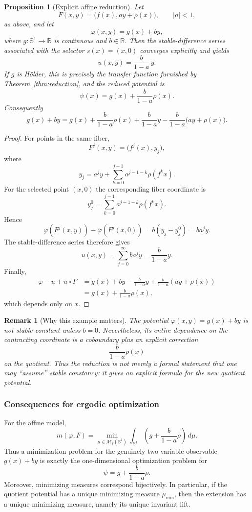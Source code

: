 \documentclass[11pt,a4paper]{article}
\newtheorem{proposition}[theorem]{Proposition}
\newtheorem{remark}[theorem]{Remark}
\newcommand{\M}{\mathcal M}
\begin{document}
\begin{proposition}[Explicit affine reduction]
\label{prop:affine-explicit}
Let
\[
F(x,y)=\bigl(f(x),ay+\rho(x)\bigr),\qquad |a|<1,
\]
as above, and let
\[
\varphi(x,y)=g(x)+by,
\]
where $g:\mathbb S^1\to\mathbb R$ is continuous and $b\in\mathbb R$.
Then the stable-difference series associated with the selector $s(x)=(x,0)$
converges explicitly and yields
\[
\boxed{u(x,y)=\frac{b}{1-a}\,y}.
\]
If $g$ is H\"older, this is precisely the transfer function furnished by
Theorem~\ref{thm:reduction}, and the reduced potential is
\[
\boxed{\psi(x)=g(x)+\frac{b}{1-a}\rho(x).}
\]
Consequently
\[
\boxed{
g(x)+by
=
g(x)+\frac{b}{1-a}\rho(x)
+\frac{b}{1-a}y
-\frac{b}{1-a}\bigl(ay+\rho(x)\bigr).
}
\]
\end{proposition}

\begin{proof}
For points in the same fiber,
\[
F^j(x,y)=\bigl(f^j(x),y_j\bigr),
\]
where
\[
y_j=a^jy+
\sum_{k=0}^{j-1}a^{j-1-k}\rho(f^kx).
\]
For the selected point $(x,0)$ the corresponding fiber coordinate is
\[
y_j^0=
\sum_{k=0}^{j-1}a^{j-1-k}\rho(f^kx).
\]
Hence
\[
\varphi(F^j(x,y))-\varphi(F^j(x,0))
=b(y_j-y_j^0)=ba^jy.
\]
The stable-difference series therefore gives
\[
u(x,y)=\sum_{j=0}^\infty ba^jy
=\frac{b}{1-a}y.
\]
Finally,
\[
\begin{aligned}
\varphi-u+u\circ F
&=g(x)+by-\frac{b}{1-a}y
+\frac{b}{1-a}(ay+\rho(x))\\
&=g(x)+\frac{b}{1-a}\rho(x),
\end{aligned}
\]
which depends only on $x$.
\end{proof}

\begin{remark}[Why this example matters]
The potential $\varphi(x,y)=g(x)+by$ is not stable-constant unless $b=0$.
Nevertheless, its entire dependence on the contracting coordinate is a
coboundary plus an explicit correction
\[
\frac{b}{1-a}\rho(x)
\]
on the quotient. Thus the reduction is not merely a formal statement that
one may ``assume'' stable constancy: it gives an explicit formula for the
new quotient potential.
\end{remark}

\subsubsection{Consequences for ergodic optimization}

For the affine model,
\[
m(\varphi,F)
=
\min_{\mu\in\M_f(\mathbb S^1)}
\int_{\mathbb S^1}
\left(g+\frac{b}{1-a}\rho\right)\,d\mu.
\]
Thus a minimization problem for the genuinely two-variable observable
$g(x)+by$ is exactly the one-dimensional optimization problem for
\[
\psi=g+\frac{b}{1-a}\rho.
\]
Moreover, minimizing measures correspond bijectively. In particular, if the
quotient potential has a unique minimizing measure $\mu_{\min}$, then the
extension has a unique minimizing measure, namely its unique invariant lift.
\end{document}
